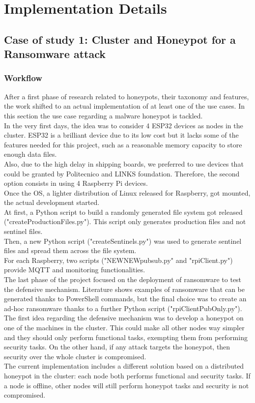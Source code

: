 \chapter{Implementation Details}
\section{Case of study 1: Cluster and Honeypot for a Ransomware attack}

\subsection{Workflow}

After a first phase of research related to honeypots, their taxonomy and features, the work shifted to an actual implementation of at least one of the use cases. In this section the use case regarding a malware honeypot is tackled.\\ 
In the very first days, the idea was to consider 4 ESP32 devices as nodes in the cluster. ESP32 is a brilliant device due to its low cost but it lacks some of the features needed for this project, such as a reasonable memory capacity to store enough data files.\\
Also, due to the high delay in shipping boards, we preferred to use devices that could be granted by Politecnico and LINKS foundation.
Therefore, the second option consists in using 4 Raspberry Pi devices.\\
Once the OS, a lighter distribution of Linux released for Raspberry, got mounted, the actual development started.\\
At first, a Python script to build a randomly generated file system got released ("createProductionFiles.py"). This script only generates production files and not sentinel files.\\
Then, a new Python script ("createSentinels.py") was used to generate sentinel files and spread them across the file system.\\
For each Raspberry, two scripts ("NEWNEWpubsub.py" and "rpiClient.py") provide MQTT and monitoring functionalities.\\
The last phase of the project focused on the deployment of ransomware to test the defensive mechanism. Literature shows examples of ransomware that can be generated thanks to PowerShell commands, but the final choice was to create an ad-hoc ransomware thanks to a further Python script ("rpiClientPubOnly.py").\\
The first idea regarding the defensive mechanism was to develop a honeypot on one of the machines in the cluster. This could make all other nodes way simpler and they should only perform functional tasks, exempting them from performing security tasks. On the other hand, if any attack targets the honeypot, then security over the whole cluster is compromised.\\
The current implementation includes a different solution based on a distributed honeypot in the cluster: each node both performs functional and security tasks. If a node is offline, other nodes will still perform honeypot tasks and security is not compromised.

